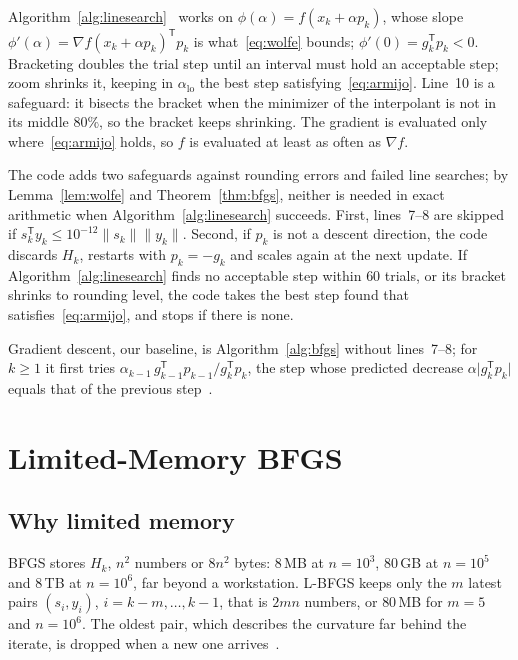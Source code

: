 \documentclass[11pt,a4paper]{amsart}
\numberwithin{equation}{section}
\theoremstyle{plain}
\theoremstyle{definition}
\theoremstyle{remark}
\newcommand{\grad}{\nabla}
\newcommand{\T}{\mathsf{T}}
\newcommand{\norm}[1]{\lVert #1 \rVert}
\begin{document}
Algorithm~\ref{alg:linesearch}~\cite[Algorithms~3.5 and~3.6]{nocedal2006}
works on $\phi(\alpha) = f(x_k + \alpha p_k)$, whose slope
$\phi'(\alpha) = \grad f(x_k + \alpha p_k)^\T p_k$ is
what~\eqref{eq:wolfe} bounds; $\phi'(0) = g_k^\T p_k < 0$. Bracketing
doubles the trial step until an interval must hold an acceptable step;
zoom shrinks it, keeping in $\alpha_{\mathrm{lo}}$ the best step
satisfying~\eqref{eq:armijo}. Line~10 is a safeguard: it bisects the
bracket when the minimizer of the interpolant is not in its middle
$80\%$, so the bracket keeps shrinking. The gradient is evaluated only
where~\eqref{eq:armijo} holds, so $f$ is evaluated at least as often as
$\grad f$.

The code adds two safeguards against rounding errors and failed line
searches; by Lemma~\ref{lem:wolfe} and Theorem~\ref{thm:bfgs}, neither
is needed in exact arithmetic when Algorithm~\ref{alg:linesearch}
succeeds. First, lines~7\nobreakdash--8 are skipped if
$s_k^\T y_k \leq 10^{-12} \norm{s_k} \norm{y_k}$. Second, if $p_k$ is
not a descent direction, the code discards $H_k$, restarts with
$p_k = -g_k$ and scales again at the next update. If
Algorithm~\ref{alg:linesearch} finds no acceptable step within $60$
trials, or its bracket shrinks to rounding level, the code takes the
best step found that satisfies~\eqref{eq:armijo}, and stops if there is
none.

Gradient descent, our baseline, is Algorithm~\ref{alg:bfgs} without
lines~7\nobreakdash--8; for $k \geq 1$ it first tries
$\alpha_{k-1}\, g_{k-1}^\T p_{k-1} / g_k^\T p_k$, the step whose
predicted decrease $\alpha \lvert g_k^\T p_k \rvert$ equals that of the
previous step~\cite[\S3.5]{nocedal2006}.

\section{Limited-Memory BFGS}\label{sec:lbfgs}

\subsection{Why limited memory}\label{sec:memory}

BFGS stores $H_k$, $n^2$ numbers or $8n^2$ bytes: $8$\,MB at
$n = 10^3$, $80$\,GB at $n = 10^5$ and $8$\,TB at $n = 10^6$, far
beyond a workstation.
L-BFGS keeps only the $m$ latest pairs $(s_i, y_i)$,
$i = k-m, \dots, k-1$, that is $2mn$ numbers, or $80$\,MB for $m = 5$
and $n = 10^6$. The oldest pair, which describes the curvature far
behind the iterate, is dropped when a new one
arrives~\cite[\S7.2]{nocedal2006}.
\end{document}
